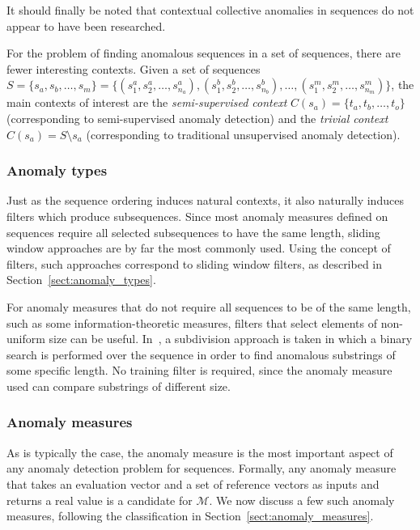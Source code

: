 It should finally be noted that contextual collective anomalies in sequences do not appear to have been researched.

For the problem of finding anomalous sequences in a set of sequences, there are fewer interesting contexts. Given a set of sequences $S = \{s_a, s_b, \dots, s_m\} = \{(s^a_1, s^a_2, \ldots, s^a_{n_a}), (s^b_1, s^b_2, \ldots, s^b_{n_b}), \ldots, (s^m_1, s^m_2, \ldots, s^m_{n_m}) \}$, the main contexts of interest are the \emph{semi-supervised context} $C(s_a) = \{t_a, t_b, \dots, t_o\}$ (corresponding to semi-supervised anomaly detection) and the \emph{trivial context} $C(s_a) = S \setminus s_a$ (corresponding to traditional unsupervised anomaly detection).

\subsubsection{Anomaly types}

Just as the sequence ordering induces natural contexts, it also naturally induces filters which produce subsequences. Since most anomaly measures defined on sequences require all selected subsequences to have the same length, sliding window approaches are by far the most commonly used. Using the concept of filters, such approaches correspond to sliding window filters, as described in Section~\ref{sect:anomaly_types}.

For anomaly measures that do not require all sequences to be of the same length, such as some information-theoretic measures, filters that select elements of non-uniform size can be useful. In~\cite{TODO}, a subdivision approach is taken in which a binary search is performed over the sequence in order to find anomalous substrings of some specific length. No training filter is required, since the anomaly measure used can compare substrings of different size.

\subsubsection{Anomaly measures}

As is typically the case, the anomaly measure is the most important aspect of any anomaly detection problem for sequences. Formally, any anomaly measure that takes an evaluation vector and a set of reference vectors as inputs and returns a real value is a candidate for $\mathcal{M}$. We now discuss a few such anomaly measures, following the classification in Section~\ref{sect:anomaly_measures}.

